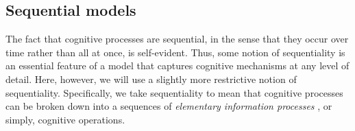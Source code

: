 


\subsection{Sequential models}

The fact that cognitive processes are sequential, in the sense that they occur over time rather than all at once, is self-evident. Thus, some notion of sequentiality is an essential feature of a model that captures cognitive mechanisms at any level of detail. Here, however, we will use a slightly more restrictive notion of sequentiality. Specifically, we take sequentiality to mean that cognitive processes can be broken down into a sequences of \emph{elementary information processes} \citep{simon1979information,posner1982information,chase1978elementary}, or simply, cognitive operations.

